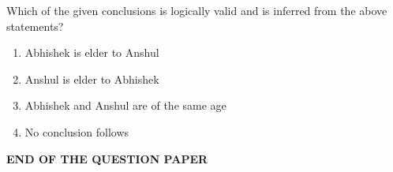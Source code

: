 \documentclass[14pt, a4paper]{extarticle}
\begin{document}
\begin{enumerate}[label=\textbf{Q. \arabic*}]
\begin{enumerate}[label=\textbf{Q.\arabic*}, start=61]
    Which of the given conclusions is logically valid and is inferred from the above statements?
    \begin{enumerate}
        \item Abhishek is elder to Anshul
        \item Anshul is elder to Abhishek
        \item Abhishek and Anshul are of the same age
        \item No conclusion follows
    \end{enumerate}

\end{enumerate}

\vspace{5mm}

\begin{center}
    \textbf{END OF THE QUESTION PAPER}
\end{center}

\end{enumerate}
\end{document}
